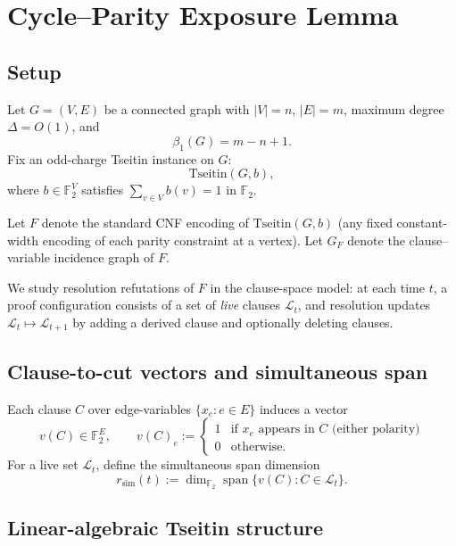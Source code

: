 \section{Cycle--Parity Exposure Lemma}
\label{sec:cycle-parity-exposure}

\newcommand{\F}{\mathbb{F}}
\newcommand{\GF}{\mathbb{F}_2}
\newcommand{\Span}{\operatorname{span}}
\newcommand{\rank}{\operatorname{rank}}
\newcommand{\supp}{\operatorname{supp}}
\newcommand{\Var}{\operatorname{Var}}

\subsection{Setup}

Let $G=(V,E)$ be a connected graph with $|V|=n$, $|E|=m$, maximum degree $\Delta=O(1)$, and
\[
\beta_1(G)=m-n+1.
\]
Fix an odd-charge Tseitin instance on $G$:
\[
\mathrm{Tseitin}(G,b),
\]
where $b\in\GF^V$ satisfies $\sum_{v\in V} b(v)=1$ in $\GF$.

Let $F$ denote the standard CNF encoding of $\mathrm{Tseitin}(G,b)$ (any fixed constant-width encoding of each parity constraint at a vertex).
Let $G_F$ denote the clause--variable incidence graph of $F$.

We study resolution refutations of $F$ in the clause-space model: at each time $t$, a proof configuration consists of a set of \emph{live} clauses $\mathcal{L}_t$, and resolution updates $\mathcal{L}_t\mapsto \mathcal{L}_{t+1}$ by adding a derived clause and optionally deleting clauses.

\subsection{Clause-to-cut vectors and simultaneous span}

Each clause $C$ over edge-variables $\{x_e:e\in E\}$ induces a vector
\[
v(C)\in \GF^E,\qquad v(C)_e :=
\begin{cases}
1 & \text{if } x_e \text{ appears in } C \text{ (either polarity)}\\
0 & \text{otherwise.}
\end{cases}
\]
For a live set $\mathcal{L}_t$, define the simultaneous span dimension
\[
r_{\mathrm{sim}}(t):=\dim_{\GF}\Span\{v(C):C\in\mathcal{L}_t\}.
\]

\subsection{Linear-algebraic Tseitin structure}

